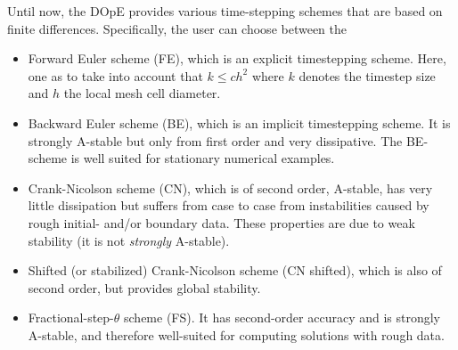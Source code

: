 Until now, the DOpE provides various time-stepping schemes
that are based on finite differences. Specifically, the 
user can choose between the 
\begin{itemize}
\item Forward Euler scheme (FE), which is an explicit timestepping scheme. Here, 
one as to take into account that $k\leq ch^2$ where $k$ denotes the timestep size
and $h$ the local mesh cell diameter.
\item Backward Euler scheme (BE), which is an implicit timestepping scheme.
It is strongly A-stable but only from first order and very dissipative. 
The BE-scheme is well suited for stationary numerical examples.  
\item Crank-Nicolson scheme (CN), which is of second order, 
A-stable, has very little dissipation but suffers from case to case from instabilities caused by rough
initial- and/or boundary data. These properties are due to weak stability (it is not \textit{strongly}
A-stable).
\item Shifted (or stabilized) Crank-Nicolson scheme (CN shifted), which is
  also of second order, but provides global stability.
\item Fractional-step-$\theta$ scheme (FS). 
It has second-order accuracy and is strongly A-stable, and therefore
well-suited for computing solutions with rough data. 
\end{itemize}
